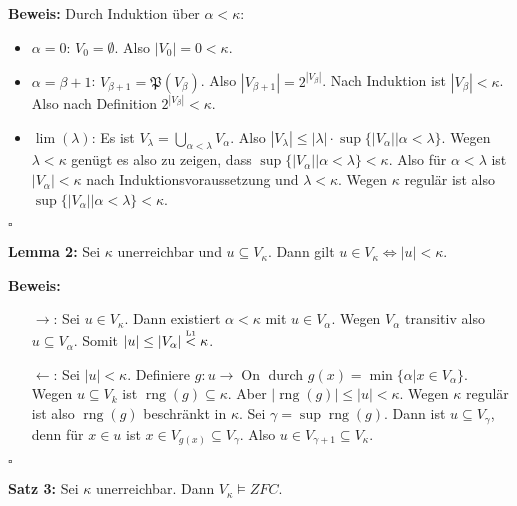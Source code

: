 \documentclass[a4paper,fontsize=11pt]{scrartcl}
\newcommand{\rng}{\operatorname{rng}}
\newcommand{\On}{\operatorname{On}}
\begin{document}
{\bf Beweis:} Durch Induktion über $\alpha<\kappa$:
\begin{itemize}
  \item $\alpha=0$: $V_0=\emptyset$. Also $|V_0|=0<\kappa$.
  \item $\alpha=\beta+1$: $V_{\beta+1}=\mathfrak{P}(V_\beta)$. Also
    $|V_{\beta+1}|=2^{|V_\beta|}$. Nach Induktion ist
    $|V_\beta|<\kappa$. Also nach Definition $2^{|V_\beta|}<\kappa$.
  \item $\lim(\lambda)$: Es ist
    $V_\lambda=\bigcup\limits_{\alpha<\lambda} V_\alpha$. Also
    $|V_\lambda|\le |\lambda|\cdot
    \sup\{|V_\alpha||\alpha<\lambda\}$. Wegen $\lambda<\kappa$ genügt
    es also zu zeigen, dass
    $\sup\{|V_\alpha||\alpha<\lambda\}<\kappa$. Also für
    $\alpha<\lambda$ ist $|V_\alpha|<\kappa$ nach
    Induktionsvoraussetzung und $\lambda<\kappa$. Wegen $\kappa$
    regulär ist also $\sup\{|V_\alpha||\alpha<\lambda\}<\kappa$.
\end{itemize}
\hfill $\square$

{\bf Lemma 2:} Sei $\kappa$ unerreichbar und $u\subseteq
V_\kappa$. Dann gilt $u\in V_\kappa\Leftrightarrow|u|<\kappa$.

{\bf Beweis:}
\begin{itemize}
\item[$\rightarrow$:] Sei $u\in V_\kappa$. Dann existiert
  $\alpha<\kappa$ mit $u\in V_\alpha$. Wegen $V_\alpha$ transitiv also
  $u\subseteq V_\alpha$. Somit $|u|\le|V_\alpha|
  \stackrel{\mbox{\tiny L1}}{<} \kappa$.
\item[$\leftarrow$:] Sei $|u|<\kappa$. Definiere $g:u\rightarrow \On$
  durch $g(x)=\min\{\alpha|x\in V_\alpha\}$. Wegen $u\subseteq V_k$
  ist $\rng(g)\subseteq\kappa$. Aber $|\rng(g)|\le |u|<\kappa$. Wegen
  $\kappa$ regulär ist also $\rng(g)$ beschränkt in $\kappa$. Sei
  $\gamma=\sup \rng (g)$. Dann ist $u\subseteq V_\gamma$, denn für
  $x\in u$ ist $x\in V_{g(x)}\subseteq V_\gamma$. Also $u\in
  V_{\gamma+1}\subseteq V_\kappa$.
\end{itemize}
\hfill $\square$

{\bf Satz 3:} Sei $\kappa$ unerreichbar. Dann $V_\kappa\models ZFC$.
\end{document}
